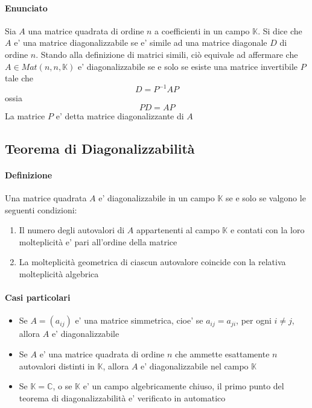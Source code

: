\documentclass[a4paper, 10pt]{article}
\begin{document}
	\paragraph*{Enunciato} Sia $A$ una matrice quadrata di ordine $n$ a coefficienti in un campo $\mathbb{K}$. 
	Si dice che $A$ e' una matrice diagonalizzabile se e' simile ad una matrice diagonale $D$ di ordine $n$.
	Stando alla definizione di matrici simili, ciò equivale ad affermare che $A \in Mat(n,n,\mathbb{K})$ e' 
	diagonalizzabile se e solo se esiste una matrice invertibile $P$ tale che \[ D = P^{-1} AP \] ossia \[PD = AP \]
	La matrice $P$ e' detta matrice diagonalizzante di $A$
	
	\subsection{Teorema di Diagonalizzabilità}
	\paragraph{Definizione}
	Una matrice quadrata $A$ e' diagonalizzabile in un campo $\mathbb{K}$ se e solo se valgono le seguenti condizioni:
	\begin{enumerate}
		\item Il numero degli autovalori di $A$ appartenenti al campo $\mathbb{K}$ e contati con la loro molteplicità e' 
		 pari all'ordine della matrice
		 \item La molteplicità geometrica di ciascun autovalore coincide con la relativa molteplicità algebrica
	\end{enumerate}
	\paragraph*{Casi particolari}
	\begin{itemize}
		\item Se $A = (a_{ij})$ e' una matrice simmetrica, cioe' se $a_{ij} = a_{ji}$, per ogni $i \neq j$,
		 allora $A$ e' diagonalizzabile
		\item Se $A$ e' una matrice quadrata di ordine $n$ che ammette esattamente $n$ autovalori distinti in $\mathbb{K}$,
		 allora $A$ e' diagonalizzabile nel campo $\mathbb{K}$
		 \item Se $\mathbb{K} = \mathbb{C}$, o se $\mathbb{K}$ e' un campo algebricamente chiuso, 
		 il primo punto del teorema di diagonalizzabilità e' verificato in automatico	
	\end{itemize}
\end{document}
